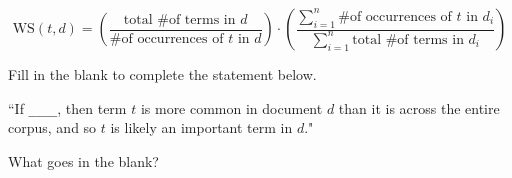 \documentclass[twoside,12pt]{article}
\begin{document}
\begin{probset}
\begin{prob}[(10 pts)]
\begin{subprobset}
\begin{subprob}
\vspace{-0.1in}

$$\text{WS}(t, d) = \left( \frac{\text{total \# of terms in $d$}}{\text{\# of occurrences of $t$ in $d$}} \right) \cdot   \left( \frac{\sum_{i=1}^n \text{\# of occurrences of $t$ in $d_i$}}{\sum_{i=1}^n \text{total \# of terms in $d_i$}}\right)$$

Fill in the blank to complete the statement below.

``If \texttt{\_\_\_\_}, then term $t$ is more common in document $d$ than it is across the entire corpus, and so $t$ is likely an important term in $d$."

What goes in the blank?







\end{subprob}

\end{subprobset}

\end{prob}

\newpage











\end{probset}
\end{document}
